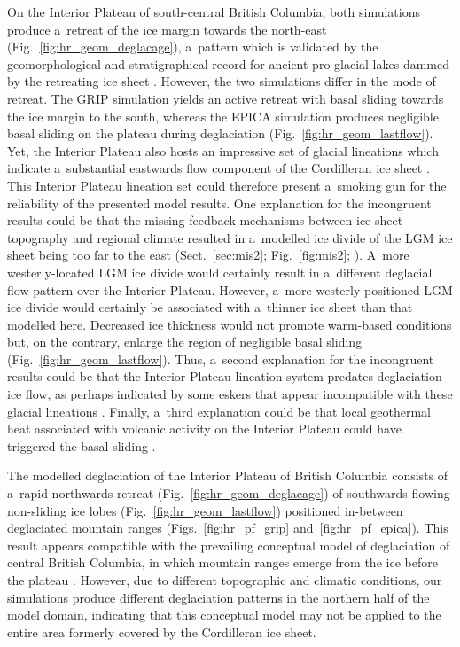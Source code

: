 \documentclass[tc, manuscript]{copernicus}
\begin{document}
      On the Interior Plateau of south-central British Columbia, both
      simulations produce a~retreat of the ice margin towards the north-east
      (Fig.~\ref{fig:hr_geom_deglacage}), a~pattern which is validated by
      the geomorphological and stratigraphical record for ancient
      pro-glacial lakes dammed by the retreating ice sheet
      \citep{Perkins.Brennand.2014}. However, the two simulations differ in
      the mode of retreat. The GRIP simulation yields an active retreat with
      basal sliding towards the ice margin to the south, whereas the EPICA
      simulation produces negligible basal sliding on the plateau during
      deglaciation (Fig.~\ref{fig:hr_geom_lastflow}). Yet, the Interior
      Plateau also hosts an impressive set of glacial lineations which
      indicate a~substantial eastwards flow component of the Cordilleran ice
      sheet \citep{Prest.etal.1968, Kleman.etal.2010}. This Interior Plateau
      lineation set could therefore present a~smoking gun for the
      reliability of the presented model results. One explanation for the
      incongruent results could be that the missing feedback mechanisms
      between ice sheet topography and regional climate resulted in
      a~modelled ice divide of the LGM ice sheet being too far to the east
      (Sect.~\ref{sec:mis2}; Fig.~\ref{fig:mis2};
      \citealp{Seguinot.etal.2014}). A~more westerly-located LGM ice divide
      would certainly result in a~different deglacial flow pattern over the
      Interior Plateau. However, a~more westerly-positioned LGM ice divide
      would certainly be associated with a~thinner ice sheet than that
      modelled here. Decreased ice thickness would not promote warm-based
      conditions but, on the contrary, enlarge the region of negligible
      basal sliding (Fig.~\ref{fig:hr_geom_lastflow}). Thus, a~second
      explanation for the incongruent results could be that the Interior
      Plateau lineation system predates deglaciation ice flow, as perhaps
      indicated by some eskers that appear incompatible with these glacial
      lineations \citep[Fig.~9]{Margold.etal.2013a}. Finally, a~third
      explanation could be that local geothermal heat associated with
      volcanic activity on the Interior Plateau could have triggered the
      basal sliding \citep[cf. Greenland ice
      sheet;][]{Fahnestock.etal.2001}.

      The modelled deglaciation of the Interior Plateau of British Columbia
      consists of a~rapid northwards retreat
      (Fig.~\ref{fig:hr_geom_deglacage}) of southwards-flowing non-sliding
      ice lobes (Fig.~\ref{fig:hr_geom_lastflow}) positioned in-between
      deglaciated mountain ranges (Figs.~\ref{fig:hr_pf_grip}
      and~\ref{fig:hr_pf_epica}). This result appears compatible with the
      prevailing conceptual model of deglaciation of central British
      Columbia, in which mountain ranges emerge from the ice before the
      plateau \citep[Fig.~7]{Fulton.1991}. However, due to different
      topographic and climatic conditions, our simulations produce different
      deglaciation patterns in the northern half of the model domain,
      indicating that this conceptual model may not be applied to the entire
      area formerly covered by the Cordilleran ice sheet.
\end{document}
